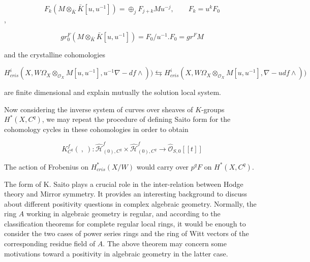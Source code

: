 \documentclass[12pt,twoside]{amsart}
\begin{document}
\[ F_k(M \otimes_{\bar{K}} \bar{K}[u,u^{-1}])=\oplus_jF_{j+k}Mu^{-j}, \qquad F_k=u^kF_0 \] , 

\[ gr_0^F(M \otimes_{\bar{K}} \bar{K}[u,u^{-1}])=F_0/u^{-1}.F_0 =gr^F M \] 

\vspace{0.5cm}

\noindent
and the crystalline cohomologies

\[ H_{cris}^i(X,W\Omega_X \otimes_{\mathcal{O}_X} M[u,u^{-1}], u^{-1} \nabla -df \wedge)) \leftrightarrows H_{cris}^i(X,W\Omega_X \otimes_{\mathcal{O}_X} M[u,u^{-1}],  \nabla - udf \wedge )) \]

\vspace{0.5cm}

\noindent
are finite dimensional and explain mutually the solution local system.

\vspace{0.5cm}

\noindent
Now considering the inverse system of curves over sheaves of $K$-groups  $H^*(X,C^q)$, we may repeat the procedure of defining Saito form for the cohomology cycles in these cohomologies in order to obtain

\[ K_{C^q}^f( \ , \ ):\widehat{\mathcal{H}}_{(0),C^q}^f \times \widehat{\mathcal{H}}_{(0),C^q}^f \to \widehat{\mathcal{O}}_{S,0}[[t]] \]

\vspace{0.5cm}

\noindent
The action of Frobenius on $H_{cris}^*(X/W)$ would carry over $p^qF$ on $H^*(X,C^q)$. 

\vspace{0.5cm}

The form of K. Saito plays a crucial role in the inter-relation between Hodge theory and Mirror symmetry. It provides an interesting background to discuss about different positivity questions in complex algebraic geometry. Normally, the ring $A$ working in algebraic geometry is regular, and according to the classification theorems for complete regular local rings, it would be enough to consider the two cases of power series rings and the ring of Witt vectors of the corresponding residue field of $A$. The above theorem may concern some motivations toward a positivity in algebraic geometry in the latter case.

\vspace{0.5cm}

\vspace{0.5cm}

\vspace{0.5cm}
\end{document}
